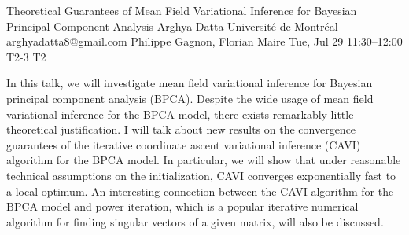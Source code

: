 \begin{talk}
  {Theoretical Guarantees of Mean Field Variational Inference for Bayesian Principal Component Analysis}%
  {Arghya Datta}%
  {Universit\'e de Montr\'eal}%
  {arghyadatta8@gmail.com}%
  {Philippe Gagnon, Florian Maire}%
  {}%
  {Tue, Jul 29 11:30--12:00}%
  {T2-3}%
  {T2}%
  
    
   
In this talk, we will investigate mean field variational inference for Bayesian principal component analysis (BPCA). Despite the wide usage of mean field variational inference for the BPCA model, there exists remarkably little theoretical justification. I will talk about new results on the convergence guarantees of the iterative coordinate ascent variational inference (CAVI) algorithm for the BPCA model. In particular, we will show that under reasonable technical assumptions on the initialization, CAVI converges exponentially fast to a local optimum. An interesting connection between the CAVI algorithm for the BPCA model and power iteration, which is a popular iterative numerical algorithm for finding singular vectors of a given matrix, will also be discussed.


\end{talk}


